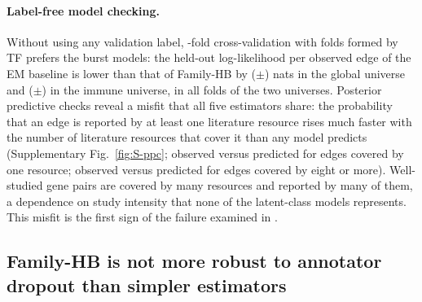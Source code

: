 \paragraph{Label-free model checking.}
Without using any validation label, \nCvFolds{}-fold cross-validation with folds formed by TF prefers the burst models: the held-out log-likelihood per observed edge of the EM baseline is lower than that of Family-HB by \nCvEmGlob{} ($\pm$\nCvEmGlobSe{}) nats in the global universe and \nCvEmImm{} ($\pm$\nCvEmImmSe{}) in the immune universe, in all \nCvFoldsHbBetter{} folds of the two universes.
Posterior predictive checks reveal a misfit that all five estimators share: the probability that an edge is reported by at least one literature resource rises much faster with the number of literature resources that cover it than any model predicts (Supplementary Fig.~\ref{fig:S-ppc}; observed \nPpcObsOne{} versus predicted \nPpcRepOne{} for edges covered by one resource; observed \nPpcObsEight{} versus predicted \nPpcRepEight{} for edges covered by eight or more).
Well-studied gene pairs are covered by many resources and reported by many of them, a dependence on study intensity that none of the latent-class models represents.
This misfit is the first sign of the failure examined in .


\subsection{Family-HB is not more robust to annotator dropout than simpler estimators}\label{sec:res-robustness}

